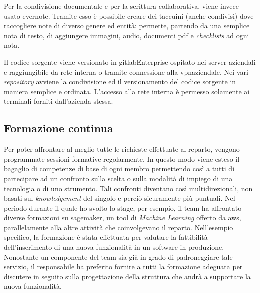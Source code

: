 Per la condivisione documentale e per la scrittura collaborativa, viene invece usato \gls{evernote}\glsfirstoccur. Tramite esso è possibile creare dei taccuini (anche condivisi) dove raccogliere note di diverso genere ed entità: permette, partendo da una semplice nota di testo, di aggiungere immagini, audio, documenti pdf e \textit{checklists} ad ogni nota.

Il codice sorgente viene versionato in \gls{gitlab}\glsfirstoccur Enterprise ospitato nei server aziendali e raggiungibile da rete interna o tramite connessione alla \acrshort{vpn}\glsfirstoccur aziendale. Nei vari \textit{repository} avviene la condivisione ed il versionamento del codice sorgente in maniera semplice e ordinata.
L'accesso alla rete interna è permesso solamente ai terminali forniti dall'azienda stessa.

\subsection{Formazione continua}
Per poter affrontare al meglio tutte le richieste effettuate al reparto, vengono programmate sessioni formative regolarmente. In questo modo viene esteso il bagaglio di competenze di base di ogni membro permettendo così a tutti di partecipare ad un confronto sulla scelta o sulla modalità di impiego di una tecnologia o di uno strumento. Tali confronti diventano così multidirezionali, non basati sul \textit{knowledgement} del singolo e perciò sicuramente più puntuali. Nel periodo durante il quale ho svolto lo stage, per esempio, il team ha affrontato diverse formazioni su \gls{sagemaker}\glsfirstoccur, un tool di \textit{Machine Learning} offerto da \acrlong{aws}\glsfirstoccur, parallelamente alla altre attività che coinvolgevano il reparto. Nell'esempio specifico, la formazione è stata effettuata per valutare la fattibilità dell'inserimento di una nuova funzionalità in un software in produzione. Nonostante un componente del team sia già in grado di padroneggiare tale servizio, il responsabile ha preferito fornire a tutti la formazione adeguata per discutere in seguito sulla progettazione della struttura che andrà a supportare la nuova funzionalità.

